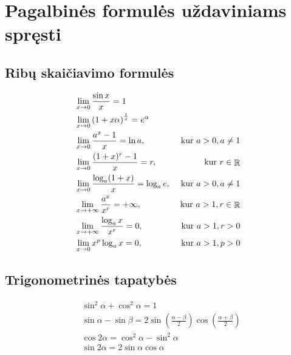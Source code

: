 \appendix
\chapter{Pagalbinės formulės uždaviniams spręsti}

\section{Ribų skaičiavimo formulės}

\begin{align} 
%
  &\lim _{x \to 0} \frac{\sin x}{x} = 1
  \label{f_lim_sin} \\
%
  &\lim _{x \to 0} \left( 1 + x \alpha \right)^{\frac{1}{x}} = e^{\alpha}
  \label{f_lim_exp} \\
%
  &\lim _{x \to 0} \frac{a^x - 1}{x} = \ln a, 
  & \text{ kur } a > 0, a \neq 1
  \label{f_lim_ep} \\
% 
  &\lim _{x \to 0} \frac{(1 + x)^r -1}{x} = r, & \text{ kur } r \in \RSET
  \label{f_lim_lp} \\
%
  &\lim _{x \to 0} \frac{\log _{a} (1 + x)}{x} = \log _{a} e, 
  & \text{ kur } a > 0, a \neq 1
  \label{f_lim_log} \\
%
  &\lim _{x \to +\infty} \frac{a^x}{x^r} = +\infty, 
  & \text{ kur } a > 1, r \in \RSET
  \label{f_lim_rl} \\
% 
  &\lim _{x \to +\infty} \frac{\log _{a} x}{x^r} = 0,
  & \text{ kur } a > 1, r > 0
  \label{f_lim_llb} \\
%
  &\lim _{x \to 0} x^p \log _{a} x = 0, & \text{ kur } a > 1, p > 0
  \label{f_lim_lln}
%
\end{align}

\section{Trigonometrinės tapatybės}

\begin{align}
%
  & \sin ^{2} \alpha + \cos ^{2} \alpha = 1
  \label{f_tri_kvsum} \\
%
  & \sin \alpha - \sin \beta = 2 
    \sin \left( \frac{\alpha - \beta}{2} \right)
    \cos \left( \frac{\alpha + \beta}{2} \right)
  \label{f_tri_sinsk} \\
%
  & \cos 2 \alpha = \cos ^{2} \alpha - \sin ^{2} \alpha
  \label{f_tri_dkcos} \\
%
  & \sin 2 \alpha = 2 \sin \alpha \cos \alpha
  \label{f_tri_dksin} 
%
\end{align}
